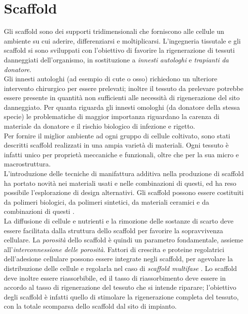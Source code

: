 
\chapter{Scaffold} %

\label{Chapter7} %

 
 

Gli scaffold sono dei supporti tridimensionali che forniscono alle cellule un ambiente su cui aderire, differenziarsi e moltiplicarsi. L'ingegneria tissutale e gli scaffold si sono sviluppati con l'obiettivo di favorire la rigenerazione di tessuti danneggiati dell'organismo, in sostituzione a \emph{innesti autologhi} e \emph{trapianti da donatore}.\\ Gli innesti autologhi (ad esempio di cute o osso) richiedono un ulteriore intervento chirurgico per essere prelevati; inoltre il tessuto da prelevare potrebbe essere presente in quantità non sufficienti alle necessità di rigenerazione del sito danneggiato. Per quanta riguarda gli innesti omologhi (da donatore della stessa specie) le problematiche di maggior importanza riguardano la carenza di materiale da donatore e il rischio biologico di infezione e rigetto.\\
Per fornire il miglior ambiente ad ogni gruppo di cellule coltivato, sono stati descritti scaffold realizzati in una ampia varietà di materiali. Ogni tessuto è infatti unico per proprietà meccaniche e funzionali, oltre che per la sua micro e macrostruttura.\\ L'introduzione delle tecniche di manifattura additiva nella produzione di scaffold ha portato novità nei materiali usati e nelle combinazioni di questi, ed ha reso possibile l'esplorazione di design alternativi. Gli scaffold possono essere costituiti da polimeri biologici, da polimeri sintetici, da materiali ceramici e da combinazioni di questi \parencite{Reference128}.\\
La diffusione di cellule e nutrienti e la rimozione delle sostanze di scarto deve essere facilitata dalla struttura dello scaffold per favorire la sopravvivenza cellulare. La \emph{porosità} dello scaffold è quindi un parametro fondamentale, assieme all'\emph{interconnessione delle porosità}. Fattori di crescita e proteine regolatrici dell'adesione cellulare possono essere integrate negli scaffold, per agevolare la distribuzione delle cellule e regolarla nel caso di \emph{scaffold multifase} \parencite{Reference129}. Lo scaffold deve inoltre essere riassorbibile, ed il tasso di riassorbimento deve essere in accordo al tasso di rigenerazione del tessuto che si intende riparare; l'obiettivo degli scaffold è infatti quello di stimolare la rigenerazione completa del tessuto, con la totale scomparsa dello scaffold dal sito di impianto. \\
